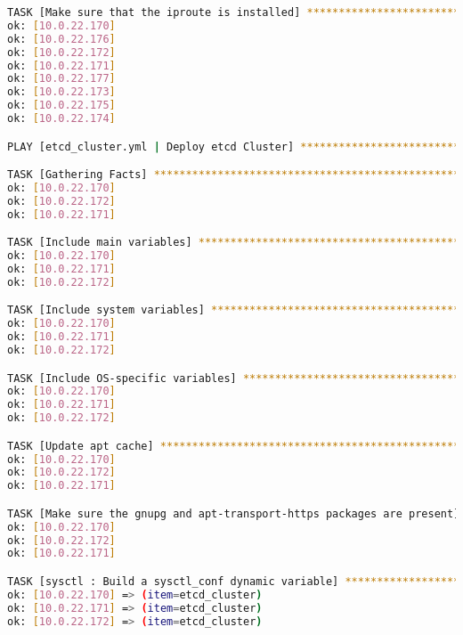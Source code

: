 \begin{flushleft}
\begin{lstlisting}[language=bash, caption=Deploy - Anhang - Deployt,captionpos=b,label={lst:deploy-appendix-deployt},breaklines=true]
TASK [Make sure that the iproute is installed] ********************************************************************************************************************************************************************
ok: [10.0.22.170]
ok: [10.0.22.176]
ok: [10.0.22.172]
ok: [10.0.22.171]
ok: [10.0.22.177]
ok: [10.0.22.173]
ok: [10.0.22.175]
ok: [10.0.22.174]

PLAY [etcd_cluster.yml | Deploy etcd Cluster] *********************************************************************************************************************************************************************

TASK [Gathering Facts] ********************************************************************************************************************************************************************************************
ok: [10.0.22.170]
ok: [10.0.22.172]
ok: [10.0.22.171]

TASK [Include main variables] *************************************************************************************************************************************************************************************
ok: [10.0.22.170]
ok: [10.0.22.171]
ok: [10.0.22.172]

TASK [Include system variables] ***********************************************************************************************************************************************************************************
ok: [10.0.22.170]
ok: [10.0.22.171]
ok: [10.0.22.172]

TASK [Include OS-specific variables] ******************************************************************************************************************************************************************************
ok: [10.0.22.170]
ok: [10.0.22.171]
ok: [10.0.22.172]

TASK [Update apt cache] *******************************************************************************************************************************************************************************************
ok: [10.0.22.170]
ok: [10.0.22.172]
ok: [10.0.22.171]

TASK [Make sure the gnupg and apt-transport-https packages are present] *******************************************************************************************************************************************
ok: [10.0.22.170]
ok: [10.0.22.172]
ok: [10.0.22.171]

TASK [sysctl : Build a sysctl_conf dynamic variable] **************************************************************************************************************************************************************
ok: [10.0.22.170] => (item=etcd_cluster)
ok: [10.0.22.171] => (item=etcd_cluster)
ok: [10.0.22.172] => (item=etcd_cluster)


\end{lstlisting}
\end{flushleft}
